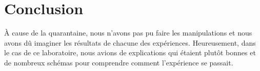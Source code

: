 \documentclass[a4paper]{article}
\begin{document}
\section{Conclusion}





À cause de la quarantaine, nous n'avons pas pu faire les manipulations et nous avons dû imaginer les résultats de chacune des expériences. Heureusement, dans le cas de ce laboratoire, nous avions de explications qui étaient plutôt bonnes et de nombreux schémas pour comprendre comment l'expérience se passait.















\newpage \tableofcontents \listoffigures
\end{document}
